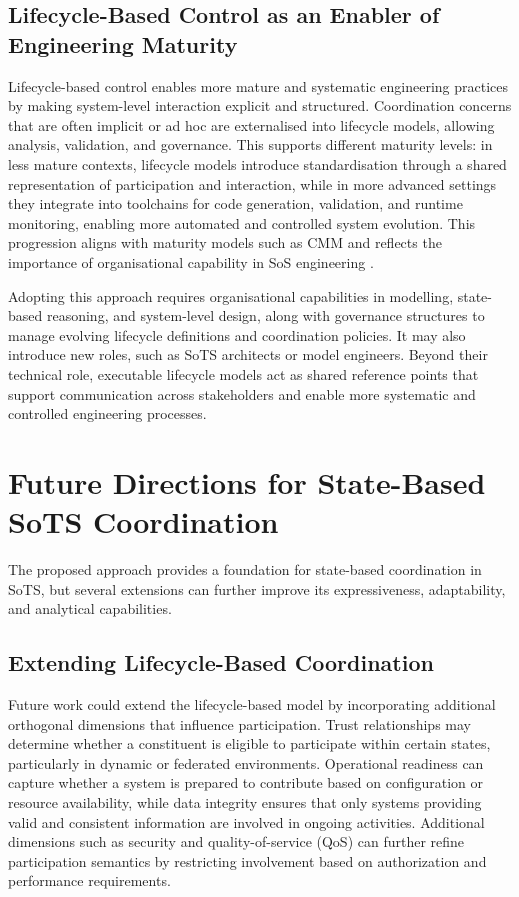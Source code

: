 \subsection{Lifecycle-Based Control as an Enabler of Engineering Maturity}

Lifecycle-based control enables more mature and systematic engineering practices by making system-level interaction explicit and structured. Coordination concerns that are often implicit or ad hoc are externalised into lifecycle models, allowing analysis, validation, and governance. This supports different maturity levels: in less mature contexts, lifecycle models introduce standardisation through a shared representation of participation and interaction, while in more advanced settings they integrate into toolchains for code generation, validation, and runtime monitoring, enabling more automated and controlled system evolution. This progression aligns with maturity models such as CMM \cite{paulk1991capability} and reflects the importance of organisational capability in SoS engineering \cite{carlock2001system}.

Adopting this approach requires organisational capabilities in modelling, state-based reasoning, and system-level design, along with governance structures to manage evolving lifecycle definitions and coordination policies. It may also introduce new roles, such as SoTS architects or model engineers. Beyond their technical role, executable lifecycle models act as shared reference points that support communication across stakeholders and enable more systematic and controlled engineering processes.

\section{Future Directions for State-Based SoTS Coordination}\label{sec:discussion-future}

The proposed approach provides a foundation for state-based coordination in SoTS, but several extensions can further improve its expressiveness, adaptability, and analytical capabilities.

\subsection{Extending Lifecycle-Based Coordination}

Future work could extend the lifecycle-based model by incorporating additional orthogonal dimensions that influence participation. Trust relationships may determine whether a constituent is eligible to participate within certain states, particularly in dynamic or federated environments. Operational readiness can capture whether a system is prepared to contribute based on configuration or resource availability, while data integrity ensures that only systems providing valid and consistent information are involved in ongoing activities. Additional dimensions such as security and quality-of-service (QoS) \cite{o2007quality} can further refine participation semantics by restricting involvement based on authorization and performance requirements.

